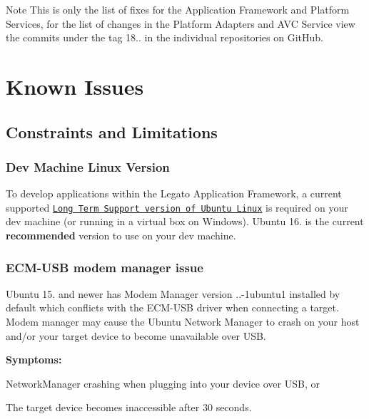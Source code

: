 \begin{DoxyNote}{Note}
This is only the list of fixes for the Application Framework and Platform Services, for the list of changes in the Platform Adapters and A\+VC Service view the commits under the tag 18.. in the individual repositories on Git\+Hub.
\end{DoxyNote}
\hypertarget{releaseNotes18060_rn1806_KnownIssues}{}\section{Known Issues}\label{releaseNotes18060_rn1806_KnownIssues}
\hypertarget{releaseNotes18060_rn1806_Constraints}{}\subsection{Constraints and Limitations}\label{releaseNotes18060_rn1806_Constraints}
\hypertarget{releaseNotes18060_rn1806_ConstraintsLinuxSupport}{}\subsubsection{Dev Machine Linux Version}\label{releaseNotes18060_rn1806_ConstraintsLinuxSupport}
To develop applications within the Legato Application Framework, a current supported \href{https://www.ubuntu.com/info/release-end-of-life}{\tt Long Term Support version of Ubuntu Linux} is required on your dev machine (or running in a virtual box on Windows). Ubuntu 16. is the current {\bfseries recommended} version to use on your dev machine.\hypertarget{releaseNotes18060_rn1806_ConstECMUSB}{}\subsubsection{E\+C\+M-\/\+U\+S\+B modem manager issue}\label{releaseNotes18060_rn1806_ConstECMUSB}
Ubuntu 15. and newer has Modem Manager version {..-\/1ubuntu1} installed by default which conflicts with the E\+C\+M-\/\+U\+SB driver when connecting a target. Modem manager may cause the Ubuntu Network Manager to crash on your host and/or your target device to become unavailable over U\+SB.

{\bfseries Symptoms\+:} 
\begin{DoxyItemize}
\item Network\+Manager crashing when plugging into your device over U\+SB, or
\item The target device becomes inaccessible after 30 seconds.
\end{DoxyItemize}

